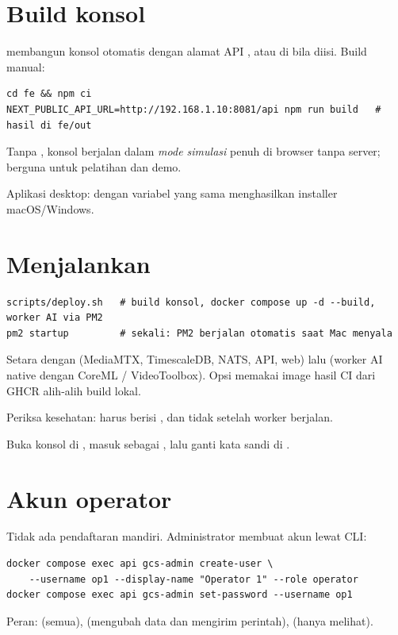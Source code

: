\section{Build konsol}
 membangun konsol otomatis dengan alamat API , atau  di  bila diisi. Build manual:
\begin{lstlisting}
cd fe && npm ci
NEXT_PUBLIC_API_URL=http://192.168.1.10:8081/api npm run build   # hasil di fe/out
\end{lstlisting}
Tanpa , konsol berjalan dalam \emph{mode simulasi} penuh di browser tanpa server; berguna untuk pelatihan dan demo.

Aplikasi desktop:  dengan variabel yang sama menghasilkan installer macOS/Windows.

\section{Menjalankan}
\begin{lstlisting}
scripts/deploy.sh   # build konsol, docker compose up -d --build, worker AI via PM2
pm2 startup         # sekali: PM2 berjalan otomatis saat Mac menyala
\end{lstlisting}
Setara dengan  (MediaMTX, TimescaleDB, NATS, API, web) lalu  (worker AI native dengan CoreML / VideoToolbox). Opsi  memakai image hasil CI dari GHCR alih-alih build lokal.

Periksa kesehatan:  harus berisi , dan  tidak  setelah worker berjalan.

Buka konsol di , masuk sebagai , lalu ganti kata sandi di .

\section{Akun operator}
Tidak ada pendaftaran mandiri. Administrator membuat akun lewat CLI:
\begin{lstlisting}
docker compose exec api gcs-admin create-user \
    --username op1 --display-name "Operator 1" --role operator
docker compose exec api gcs-admin set-password --username op1
\end{lstlisting}
Peran:  (semua),  (mengubah data dan mengirim perintah),  (hanya melihat).

